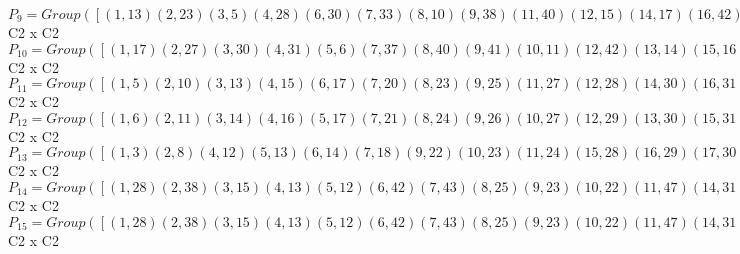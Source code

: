 \documentclass[varwidth=\maxdimen,border=10]{standalone}
\begin{document}
\begin{tabular}
$P_{9} = Group( [ ( 1,13)( 2,23)( 3, 5)( 4,28)( 6,30)( 7,33)( 8,10)( 9,38)(11,40)(12,15)(14,17)(16,42)(18,20)(19,43)(21,45)(22,25)(24,27)(26,47)(29,31)(32,35)(34,37)(36,48)(39,41)(44,46), ( 1,30)( 2,40)( 3,17)( 4,42)( 5,14)( 6,13)( 7,45)( 8,27)( 9,47)(10,24)(11,23)(12,31)(15,29)(16,28)(18,37)(19,48)(20,34)(21,33)(22,41)(25,39)(26,38)(32,46)(35,44)(36,43) ] )\cong$ C2 x C2\ \\
$P_{10} = Group( [ ( 1,17)( 2,27)( 3,30)( 4,31)( 5, 6)( 7,37)( 8,40)( 9,41)(10,11)(12,42)(13,14)(15,16)(18,45)(19,46)(20,21)(22,47)(23,24)(25,26)(28,29)(32,48)(33,34)(35,36)(38,39)(43,44), ( 1,12)( 2,22)( 3, 4)( 5,28)( 6,29)( 7,32)( 8, 9)(10,38)(11,39)(13,15)(14,16)(17,42)(18,19)(20,43)(21,44)(23,25)(24,26)(27,47)(30,31)(33,35)(34,36)(37,48)(40,41)(45,46) ] )\cong$ C2 x C2\ \\
$P_{11} = Group( [ ( 1, 5)( 2,10)( 3,13)( 4,15)( 6,17)( 7,20)( 8,23)( 9,25)(11,27)(12,28)(14,30)(16,31)(18,33)(19,35)(21,37)(22,38)(24,40)(26,41)(29,42)(32,43)(34,45)(36,46)(39,47)(44,48), ( 1,30)( 2,40)( 3,17)( 4,42)( 5,14)( 6,13)( 7,45)( 8,27)( 9,47)(10,24)(11,23)(12,31)(15,29)(16,28)(18,37)(19,48)(20,34)(21,33)(22,41)(25,39)(26,38)(32,46)(35,44)(36,43) ] )\cong$ C2 x C2\ \\
$P_{12} = Group( [ ( 1, 6)( 2,11)( 3,14)( 4,16)( 5,17)( 7,21)( 8,24)( 9,26)(10,27)(12,29)(13,30)(15,31)(18,34)(19,36)(20,37)(22,39)(23,40)(25,41)(28,42)(32,44)(33,45)(35,46)(38,47)(43,48), ( 1,12)( 2,22)( 3, 4)( 5,28)( 6,29)( 7,32)( 8, 9)(10,38)(11,39)(13,15)(14,16)(17,42)(18,19)(20,43)(21,44)(23,25)(24,26)(27,47)(30,31)(33,35)(34,36)(37,48)(40,41)(45,46) ] )\cong$ C2 x C2\ \\
$P_{13} = Group( [ ( 1, 3)( 2, 8)( 4,12)( 5,13)( 6,14)( 7,18)( 9,22)(10,23)(11,24)(15,28)(16,29)(17,30)(19,32)(20,33)(21,34)(25,38)(26,39)(27,40)(31,42)(35,43)(36,44)(37,45)(41,47)(46,48), ( 1,12)( 2,22)( 3, 4)( 5,28)( 6,29)( 7,32)( 8, 9)(10,38)(11,39)(13,15)(14,16)(17,42)(18,19)(20,43)(21,44)(23,25)(24,26)(27,47)(30,31)(33,35)(34,36)(37,48)(40,41)(45,46) ] )\cong$ C2 x C2\ \\
$P_{14} = Group( [ ( 1,28)( 2,38)( 3,15)( 4,13)( 5,12)( 6,42)( 7,43)( 8,25)( 9,23)(10,22)(11,47)(14,31)(16,30)(17,29)(18,35)(19,33)(20,32)(21,48)(24,41)(26,40)(27,39)(34,46)(36,45)(37,44), ( 1, 3)( 2, 8)( 4,12)( 5,13)( 6,14)( 7,18)( 9,22)(10,23)(11,24)(15,28)(16,29)(17,30)(19,32)(20,33)(21,34)(25,38)(26,39)(27,40)(31,42)(35,43)(36,44)(37,45)(41,47)(46,48) ] )\cong$ C2 x C2\ \\
$P_{15} = Group( [ ( 1,28)( 2,38)( 3,15)( 4,13)( 5,12)( 6,42)( 7,43)( 8,25)( 9,23)(10,22)(11,47)(14,31)(16,30)(17,29)(18,35)(19,33)(20,32)(21,48)(24,41)(26,40)(27,39)(34,46)(36,45)(37,44), ( 1, 4)( 2, 9)( 3,12)( 5,15)( 6,16)( 7,19)( 8,22)(10,25)(11,26)(13,28)(14,29)(17,31)(18,32)(20,35)(21,36)(23,38)(24,39)(27,41)(30,42)(33,43)(34,44)(37,46)(40,47)(45,48) ] )\cong$ C2 x C2\ \\

\end{tabular}
\end{document}
